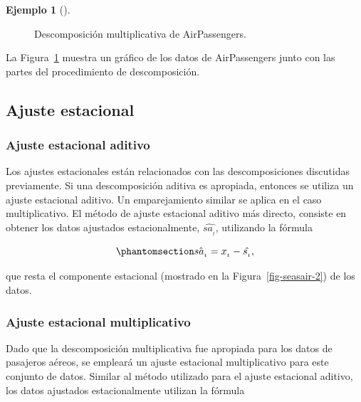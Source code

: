 \documentclass[
  us-letterpaper,
]{scrreprt}
\theoremstyle{plain}
\theoremstyle{definition}
\theoremstyle{definition}
\newtheorem{example}{Ejemplo}[chapter]
\theoremstyle{plain}
\theoremstyle{remark}
\begin{document}
\begin{example}[]
\begin{tcolorbox}
\begin{enumerate}
\begin{figure}[H]
{  }

  \caption{\label{fig-descmul}Descomposición multiplicativa de
  AirPassengers.}

  \end{figure}%
\end{enumerate}

La Figura~\ref{fig-descmul} muestra un gráfico de los datos de
AirPassengers junto con las partes del procedimiento de descomposición.

\end{tcolorbox}

\end{example}

\subsection{Ajuste estacional}\label{ajuste-estacional}

\subsubsection{Ajuste estacional
aditivo}\label{ajuste-estacional-aditivo}

Los ajustes estacionales están relacionados con las descomposiciones
discutidas previamente. Si una descomposición aditiva es apropiada,
entonces se utiliza un ajuste estacional aditivo. Un emparejamiento
similar se aplica en el caso multiplicativo. El método de ajuste
estacional aditivo más directo, consiste en obtener los datos ajustados
estacionalmente, \(\hat{sa_{_t}}\), utilizando la fórmula

\begin{equation}\phantomsection\label{eq-AEadd}{
\hat{sa_{_t}}=x_{_t}-\hat{s_{_t}},
}\end{equation}

que resta el componente estacional (mostrado en la
Figura~\ref{fig-seasair-2}) de los datos.

\subsubsection{Ajuste estacional
multiplicativo}\label{ajuste-estacional-multiplicativo}

Dado que la descomposición multiplicativa fue apropiada para los datos
de pasajeros aéreos, se empleará un ajuste estacional multiplicativo
para este conjunto de datos. Similar al método utilizado para el ajuste
estacional aditivo, los datos ajustados estacionalmente utilizan la
fórmula
\end{document}
